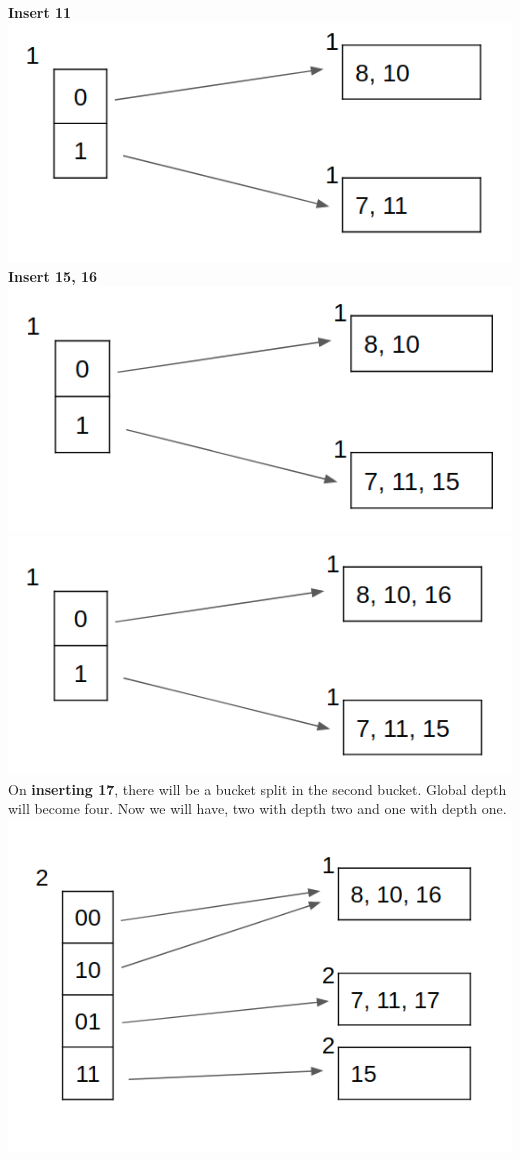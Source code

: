 \documentclass[12pt]{article}
\begin{document}
\begin{enumerate}
\textbf{Insert 11}\\
\includegraphics[scale=0.5]{52b.png}\\
\textbf{Insert 15, 16}\\
\includegraphics[scale=0.5]{53a.png}\\
\includegraphics[scale=0.5]{53b.png}\\
On \textbf{inserting 17}, there will be a bucket split in the second bucket. Global depth will become four. Now we will have, two with depth two and one with depth one.\\
\includegraphics[scale=0.5]{54.png}\\

\end{enumerate}
\end{document}
